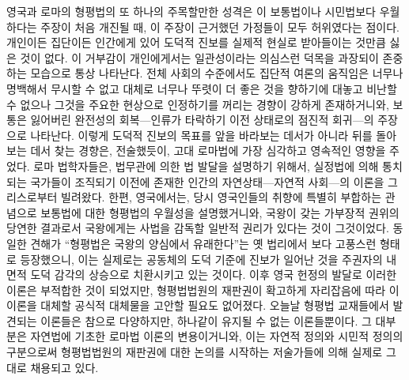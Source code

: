 영국과 로마의 형평법의 또 하나의 주목할만한 성격은
이 보통법이나 시민법보다 우월하다는 주장이 처음
개진될 때, 이 주장이 근거했던 가정들이 모두 허위였다는 점이다.
개인이든 집단이든 인간에게 있어 도덕적 진보를 실제적 현실로
받아들이는 것만큼 싫은 것이 없다.
이 거부감이 개인에게서는 일관성이라는 의심스런 덕목을 과장되이 존중하는
모습으로 통상 나타난다.
전체 사회의 수준에서도 집단적 여론의 움직임은 너무나 명백해서 무시할 수 없고
대체로 너무나 뚜렷이 더 좋은 것을 향하기에 대놓고 비난할 수 없으나
그것을 주요한 현상으로 인정하기를 꺼리는 경향이 강하게 존재하거니와,
보통은 잃어버린 완전성의 회복---인류가 타락하기 이전 상태로의 점진적
회귀---의 주장으로 나타난다.
이렇게 도덕적 진보의 목표를 앞을 바라보는 데서가 아니라
뒤를 돌아보는 데서 찾는 경향은, 전술했듯이,
고대 로마법에 가장 심각하고 영속적인 영향을 주었다.
로마 법학자들은, 법무관에 의한 법 발달을 설명하기 위해서,
실정법에 의해 통치되는 국가들이 조직되기 이전에 존재한
인간의 자연상태---자연적 사회---의 이론을 그리스로부터 빌려왔다.
한편, 영국에서는, 당시 영국인들의 취향에 특별히 부합하는 관념으로
보통법에 대한 형평법의 우월성을 설명했거니와,
국왕이 갖는 가부장적 권위의 당연한 결과로서 국왕에게는
사법을 감독할 일반적 권리가 있다는 것이 그것이었다.
동일한 견해가
``형평법은 국왕의 양심에서 유래한다''는
옛 법리에서
보다 고풍스런 형태로
등장했으니, 이는
실제로는 공동체의 도덕 기준에 진보가 일어난 것을
주권자의 내면적 도덕 감각의 상승으로 치환시키고 있는 것이다.
이후 영국 헌정의 발달로 이러한 이론은 부적합한 것이 되었지만,
형평법법원의 재판권이 확고하게 자리잡음에 따라 이 이론을 대체할 공식적 대체물을
고안할 필요도 없어졌다.
오늘날 형평법 교재들에서 발견되는 이론들은 참으로 다양하지만,
하나같이 유지될 수 없는 이론들뿐이다.
그 대부분은 자연법에 기초한 로마법 이론의 변용이거니와,
이는
자연적 정의와 시민적 정의의 구분으로써
형평법법원의 재판권에 대한 논의를 시작하는
저술가들에 의해
실제로 그대로
채용되고 있다.

